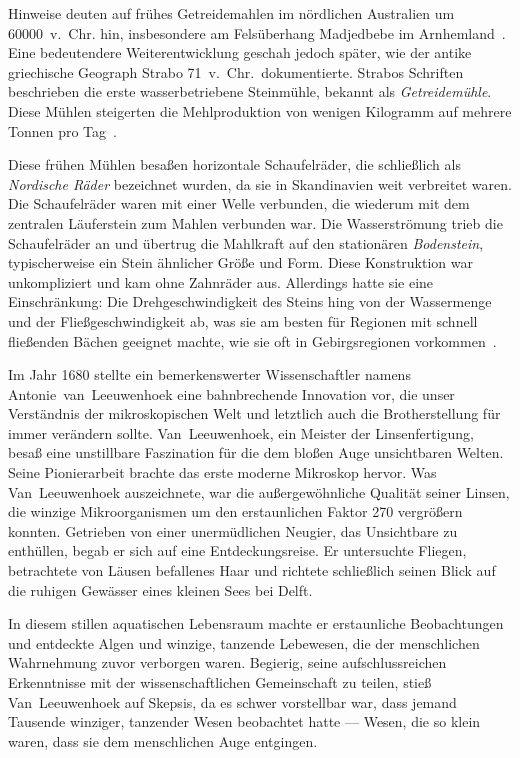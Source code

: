 Hinweise deuten auf frühes Getreidemahlen im nördlichen Australien um
\num{60000}~v.~Chr. hin, insbesondere am Felsüberhang Madjedbebe im Arnhemland~\cite{aboriginal+grinding+stones}.
Eine bedeutendere Weiterentwicklung
geschah jedoch später, wie der antike griechische Geograph
Strabo \num{71}~v.~Chr.\ dokumentierte. Strabos Schriften beschrieben die erste
wasserbetriebene Steinmühle, bekannt als \emph{Getreidemühle}. Diese Mühlen steigerten die
Mehlproduktion von wenigen Kilogramm auf mehrere Tonnen pro Tag~\cite{history+mills}.

Diese frühen Mühlen besaßen horizontale Schaufelräder, die schließlich als
\emph{Nordische Räder} bezeichnet wurden, da sie in Skandinavien weit verbreitet waren.
Die Schaufelräder waren mit einer Welle verbunden, die wiederum mit dem zentralen Läuferstein
zum Mahlen verbunden war. Die Wasserströmung trieb die Schaufelräder an und übertrug die Mahlkraft
auf den stationären \emph{Bodenstein}, typischerweise ein Stein ähnlicher Größe und
Form. Diese Konstruktion war unkompliziert und kam ohne Zahnräder aus. Allerdings
hatte sie eine Einschränkung: Die Drehgeschwindigkeit des Steins hing von der Wassermenge und
der Fließgeschwindigkeit ab, was sie am besten für Regionen mit schnell fließenden Bächen
geeignet machte, wie sie oft in Gebirgsregionen vorkommen~\cite{mills+scandinavia}.

Im Jahr \num{1680} stellte ein bemerkenswerter Wissenschaftler namens
Antonie~van~Leeuwenhoek eine bahnbrechende Innovation vor, die
unser Verständnis der mikroskopischen Welt und letztlich auch die Brotherstellung
für immer verändern sollte. Van~Leeuwenhoek, ein Meister der Linsenfertigung, besaß eine
unstillbare Faszination für die dem bloßen Auge unsichtbaren Welten. Seine Pionierarbeit
brachte das erste moderne Mikroskop hervor. Was Van~Leeuwenhoek auszeichnete, war
die außergewöhnliche Qualität seiner Linsen, die winzige
Mikroorganismen um den erstaunlichen Faktor \num{270} vergrößern konnten. Getrieben von einer
unermüdlichen Neugier, das Unsichtbare zu enthüllen, begab er sich auf eine Entdeckungsreise. Er
untersuchte Fliegen, betrachtete von Läusen befallenes Haar und richtete schließlich seinen Blick
auf die ruhigen Gewässer eines kleinen Sees bei Delft.

In diesem stillen aquatischen Lebensraum machte er erstaunliche Beobachtungen und entdeckte
Algen und winzige, tanzende Lebewesen, die der menschlichen Wahrnehmung zuvor verborgen waren.
Begierig, seine aufschlussreichen Erkenntnisse mit der wissenschaftlichen Gemeinschaft zu teilen,
stieß Van~Leeuwenhoek auf Skepsis, da es schwer vorstellbar war, dass jemand
Tausende winziger, tanzender Wesen beobachtet hatte --- Wesen, die so klein waren,
dass sie dem menschlichen Auge entgingen.

